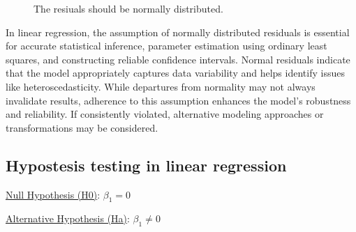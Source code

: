 \documentclass[
  a4paper,
]{scrbook}
\begin{document}
\begin{figure}[H]


\caption{\label{fig-lm-resid-qq}The resiuals should be normally
distributed.}

\end{figure}%

In linear regression, the assumption of normally distributed residuals
is essential for accurate statistical inference, parameter estimation
using ordinary least squares, and constructing reliable confidence
intervals. Normal residuals indicate that the model appropriately
captures data variability and helps identify issues like
heteroscedasticity. While departures from normality may not always
invalidate results, adherence to this assumption enhances the model's
robustness and reliability. If consistently violated, alternative
modeling approaches or transformations may be considered.

\subsection{Hypostesis testing in linear
regression}\label{hypostesis-testing-in-linear-regression}

\hyperref[H0]{Null Hypothesis (H0)}: \(\beta_1 = 0\)

\hyperref[Ha]{Alternative Hypothesis (Ha)}: \(\beta_1 \neq 0\)

\begin{table}

\caption{\label{tbl-lm-t-test}The significance of model parameters.}


\end{table}%
\end{document}
